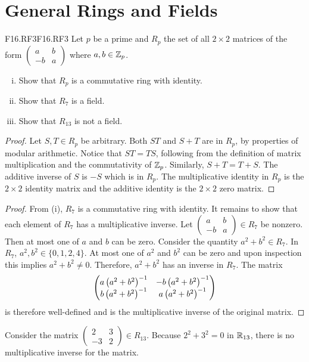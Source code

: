 \documentclass[../AlgebraQualSolutions.tex]{subfiles}
\begin{document}
\section{General Rings and Fields}

\begin{prob}{F16.RF3}{F16.RF3}
    Let $p$ be a prime and $R_p$ the set of all $2 \times 2$ matrices of the form $\begin{pmatrix} a & b\\ -b & a\end{pmatrix}$ where $a,b \in \mathbb{Z}_p$.

    \begin{enumerate}[(i)]
        \item Show that $R_p$ is a commutative ring with identity.
        \item Show that $R_7$ is a field.
        \item Show that $R_{13}$ is not a field.
    \end{enumerate}
\end{prob}

\begin{proof}
    Let $S,T \in R_p$ be arbitrary. Both $ST$ and $S + T$ are in $R_p$, by properties of modular arithmetic. Notice that $ST = TS$, following from the definition of matrix multiplication and the commutativity of $\mathbb{Z}_p$. Similarly, $S + T = T + S$. The additive inverse of $S$ is $-S$ which is in $R_p$. The multiplicative identity in $R_p$ is the $2 \times 2$ identity matrix and the additive identity is the $2 \times 2$ zero matrix.
\end{proof}

\begin{proof}
    From (i), $R_7$ is a commutative ring with identity. It remains to show that each element of $R_7$ has a multiplicative inverse. Let $\begin{pmatrix} a & b\\ -b & a\end{pmatrix} \in R_7$ be nonzero. Then at most one of $a$ and $b$ can be zero. Consider the quantity $a^2 + b^2 \in R_7$. In $R_7$, $a^2,b^2 \in \{0, 1, 2, 4\}$. At most one of $a^2$ and $b^2$ can be zero and upon inspection this implies $a^2 + b^2 \neq 0$. Therefore, $a^2 + b^2$ has an inverse in $R_7$. The matrix 
        \[\begin{pmatrix}
            a \left(a^2 + b^2\right)^{-1} & -b \left(a^2 + b^2\right)^{-1}\\
            b\left(a^2 + b^2\right)^{-1} & a\left(a^2 + b^2\right)^{-1}
        \end{pmatrix}\]
    is therefore well-defined and is the multiplicative inverse of the original matrix.
\end{proof}

\begin{solution}
    Consider the matrix $\begin{pmatrix} 2 & 3\\ -3 & 2\end{pmatrix} \in R_{13}$. Because $2^2 + 3^2 = 0$ in $\mathbb{R}_{13}$, there is no multiplicative inverse for the matrix.
\end{solution}
\end{document}
